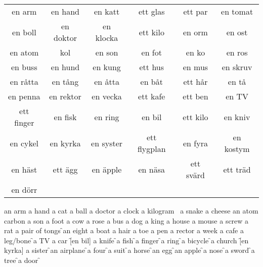 \begin{center}
    \begin{tabular}{|c c c c c c|}
        \hline
        en arm & en hand & en katt & ett glas & ett par & en tomat \\
        en boll & en doktor & en klocka & ett kilo & en orm & en ost \\
        en atom & kol & en son & en fot & en ko & en ros \\
        en buss & en hund & en kung & ett hus & en mus & en skruv \\
        en råtta & en tång & en åtta & en båt & ett hår & en tå \\
        en penna & en rektor & en vecka & ett kafe & ett ben & en TV \\
        ett finger & en fisk & en ring & en bil & ett kilo &  en kniv \\
        en cykel  & en kyrka & en syster & ett flygplan & en fyra & en kostym \\
        en häst & ett ägg & en äpple & en näsa & ett svärd & ett träd \\
        en dörr &&&&& \\
        \hline
    \end{tabular}
\end{center}

\begin{questions}
    \begin{multicols}{3}
        \raggedcolumns
        \question an arm \fillin
        \question a hand \fillin
        \question a cat \fillin
        \question a ball \fillin
        \question a doctor \fillin
        \question a clock \fillin
        \question a kilogram \fillin
        \question a snake \fillin
        \question a cheese \fillin
        \question an atom \fillin
        \question carbon \fillin
        \question a son \fillin
        \question a foot \fillin
        \question a cow \fillin
        \question a rose \fillin
        \question a bus \fillin
        \question a dog \fillin
        \question a king \fillin
        \question a house \fillin
        \question a mouse \fillin
        \question a screw \fillin
        \question a rat \fillin
        \question a pair of tongs \f
        \question an eight \fillin
        \question a boat \fillin
        \question a hair \fillin
        \question a toe \fillin
        \question a pen \fillin
        \question a rector \fillin
        \question a week \fillin
        \question a cafe \fillin
        \question a leg/bone \f
        \question a TV \fillin
        \question a car \f[en bil]
        \question a knife \f
        \question a fish \f
        \question a finger \f
        \question a ring \f
        \question a bicycle \f
        \question a church \f[en kyrka]
        \question a sister \f
        \question an airplane \f
        \question a four \f
        \question a suit \f
        \question a horse \f
        \question an egg \f
        \question an apple \f
        \question a nose \f
        \question a sword \f
        \question a tree \f
        \question a door \f
    \end{multicols}
\end{questions}
